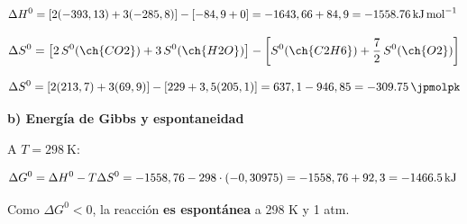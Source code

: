 \begin{exerciseEVAU}
\begin{solu}
        \begin{equation*}
            \Delta H^0 = \left[ 2(-393,13) + 3(-285,8) \right] - \left[ -84,9 + 0 \right] = -1643,66 + 84,9 = \energia[kjmol]{-1558.76}
        \end{equation*}

        \begin{equation*}
            \Delta S^0 = \left[ 2\, S^0 (\ch{CO2}) + 3\, S^0 (\ch{H2O}) \right] - \left[ S^0 (\ch{C2H6}) + \dfrac{7}{2}\, S^0 (\ch{O2}) \right]
        \end{equation*}

        \begin{equation*}
            \Delta S^0 = \left[ 2(213,7) + 3(69,9) \right] - \left[ 229 + 3,5(205,1) \right] = 637,1 - 946,85 = \SI{-309.75}{\jpmolpk}
        \end{equation*}

        \textbf{b) Energía de Gibbs y espontaneidad}

        A \(T = \SI{298}{\kelvin}\):

        \begin{equation*}
            \Delta G^0 = \Delta H^0 - T \Delta S^0 = -1558,76 - 298 \cdot (-0,30975) = -1558,76 + 92,3 = \energia[kj]{-1466.5}
        \end{equation*}

        Como \(\Delta G^0 < 0\), la reacción \textbf{es espontánea} a 298 K y 1 atm.

    \end{solu}
\end{exerciseEVAU}

